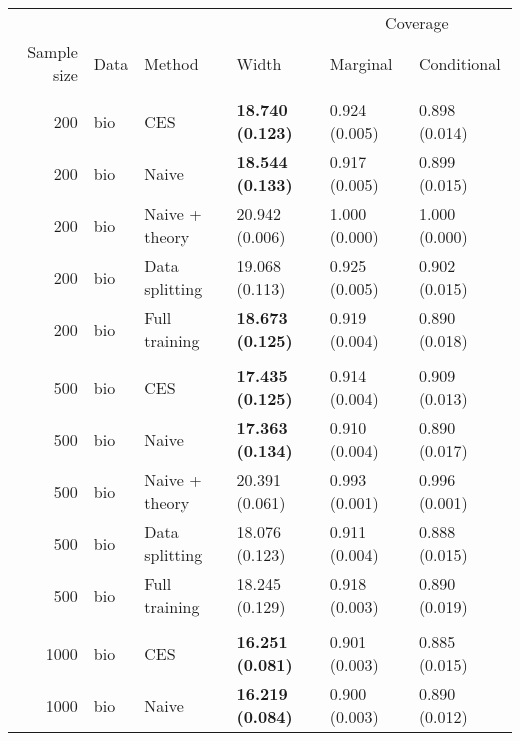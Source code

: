 \begin{tabular}[t]{rlllll}
\toprule
\multicolumn{4}{c}{ } & \multicolumn{2}{c}{Coverage} \\
\cmidrule(l{3pt}r{3pt}){5-6}
Sample size & Data & Method & Width & Marginal & Conditional\\
\midrule
\addlinespace[0.3em]
\multicolumn{6}{l}{\textbf{200}}\\
\hspace{1em}200 & bio & CES & \textbf{18.740 (0.123)} & 0.924 (0.005) & 0.898 (0.014)\\
\hspace{1em}200 & bio & Naive & \textbf{18.544 (0.133)} & 0.917 (0.005) & 0.899 (0.015)\\
\hspace{1em}200 & bio & Naive + theory & 20.942 (0.006) & 1.000 (0.000) & 1.000 (0.000)\\
\hspace{1em}200 & bio & Data splitting & 19.068 (0.113) & 0.925 (0.005) & 0.902 (0.015)\\
\hspace{1em}200 & bio & Full training & \textbf{18.673 (0.125)} & 0.919 (0.004) & 0.890 (0.018)\\
\addlinespace[0.3em]
\multicolumn{6}{l}{\textbf{500}}\\
\hspace{1em}500 & bio & CES & \textbf{17.435 (0.125)} & 0.914 (0.004) & 0.909 (0.013)\\
\hspace{1em}500 & bio & Naive & \textbf{17.363 (0.134)} & 0.910 (0.004) & 0.890 (0.017)\\
\hspace{1em}500 & bio & Naive + theory & 20.391 (0.061) & 0.993 (0.001) & 0.996 (0.001)\\
\hspace{1em}500 & bio & Data splitting & 18.076 (0.123) & 0.911 (0.004) & 0.888 (0.015)\\
\hspace{1em}500 & bio & Full training & 18.245 (0.129) & 0.918 (0.003) & 0.890 (0.019)\\
\addlinespace[0.3em]
\multicolumn{6}{l}{\textbf{1000}}\\
\hspace{1em}1000 & bio & CES & \textbf{16.251 (0.081)} & 0.901 (0.003) & 0.885 (0.015)\\
\hspace{1em}1000 & bio & Naive & \textbf{16.219 (0.084)} & 0.900 (0.003) & 0.890 (0.012)\\

\end{tabular}

